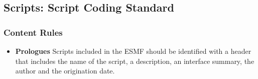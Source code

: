 
\subsection{Scripts: Script Coding Standard}

\subsubsection{Content Rules}

\begin{itemize}

\item {\bf Prologues} Scripts included in the ESMF should be identified 
with a header that includes the name of the script, a description, an 
interface summary, the author and the origination date.

\end{itemize}




